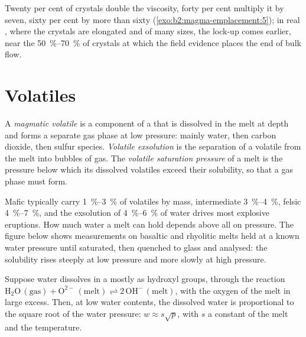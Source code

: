 Twenty per cent of crystals double the viscosity, forty per cent multiply it by
seven, sixty per cent by more than sixty (\cref{exo:b2:magma-emplacement:5}); in real , where the
crystals are elongated and of many sizes, the lock-up comes earlier, near the
\qtyrange{50}{70}{\percent} of crystals at which the field evidence places the
end of bulk flow.

\section{Volatiles}

\begin{definition}\label{def:b2:magma-emplacement:volatiles}
A \emph{magmatic volatile} is a component of a  that
is dissolved in the melt at depth and forms a separate gas phase at low
pressure: mainly water, then carbon dioxide, then sulfur species. \emph{Volatile
exsolution} is the separation of a volatile from the
melt into bubbles of gas. The \emph{volatile saturation
pressure} of a melt is the pressure below which
its dissolved volatiles exceed their solubility, so that a gas phase must form.
\end{definition}

Mafic  typically carry \qtyrange{1}{3}{\percent} of volatiles by mass,
intermediate  \qtyrange{3}{4}{\percent}, felsic 
\qtyrange{4}{7}{\percent}, and the exsolution of \qtyrange{4}{6}{\percent} of
water drives most explosive eruptions. How much water a melt can hold depends
above all on pressure. The figure below shows measurements on basaltic and
rhyolitic melts held at a known water pressure until saturated, then quenched
to glass and analysed: the solubility rises steeply at low pressure and more
slowly at high pressure.

\begin{proposition}\label{prop:b2:magma-emplacement:sqrt}
Suppose water dissolves in a  mostly as hydroxyl groups, through
the reaction $\mathrm{H_2O\,(gas)} + \mathrm{O^{2-}\,(melt)} \rightleftharpoons
2\,\mathrm{OH^-\,(melt)}$, with the oxygen of the melt in large excess. Then, at
low water contents, the dissolved water is proportional to the square root of
the water pressure: $w \approx s\sqrt{p}$, with $s$ a constant of the melt and the
temperature.
\end{proposition}

